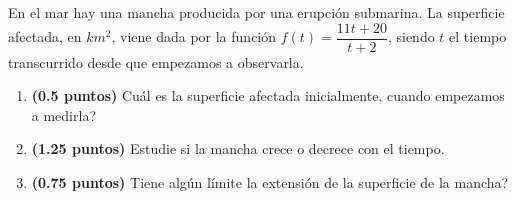 
En el mar hay una mancha producida por una erupción submarina. La superficie afectada, en $km^2$, viene dada por la función $f(t)=\dfrac{11t+20}{t+2}$, siendo $t$ el tiempo transcurrido desde que empezamos a observarla.
\begin{enumerate}[label=\alph*)]
\item \textbf{(0.5 puntos)} \textquestiondown{}Cuál es la superficie afectada inicialmente, cuando empezamos a medirla?
\item \textbf{(1.25 puntos)} Estudie si la mancha crece o decrece con el tiempo.
\item \textbf{(0.75 puntos)} \textquestiondown{}Tiene algún límite la extensión de la superficie de la mancha?
\end{enumerate}

